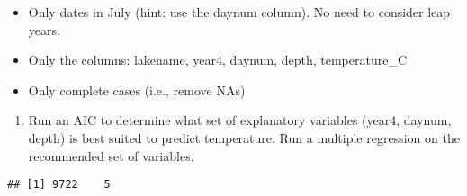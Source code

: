\documentclass[]{article}
\newenvironment{Shaded}{\begin{snugshade}}{\end{snugshade}}
\newcommand{\CommentTok}[1]{\textcolor[rgb]{0.56,0.35,0.01}{\textit{#1}}}
\newcommand{\DataTypeTok}[1]{\textcolor[rgb]{0.13,0.29,0.53}{#1}}
\newcommand{\DecValTok}[1]{\textcolor[rgb]{0.00,0.00,0.81}{#1}}
\newcommand{\KeywordTok}[1]{\textcolor[rgb]{0.13,0.29,0.53}{\textbf{#1}}}
\newcommand{\NormalTok}[1]{#1}
\newcommand{\OperatorTok}[1]{\textcolor[rgb]{0.81,0.36,0.00}{\textbf{#1}}}
\newcommand{\StringTok}[1]{\textcolor[rgb]{0.31,0.60,0.02}{#1}}
\providecommand{\tightlist}{%
  \setlength{\itemsep}{0pt}\setlength{\parskip}{0pt}}
\begin{document}
\begin{itemize}
\tightlist
\item
  Only dates in July (hint: use the daynum column). No need to consider
  leap years.
\item
  Only the columns: lakename, year4, daynum, depth, temperature\_C
\item
  Only complete cases (i.e., remove NAs)
\end{itemize}

\begin{enumerate}
\def\labelenumi{\arabic{enumi}.}
\setcounter{enumi}{3}
\tightlist
\item
  Run an AIC to determine what set of explanatory variables (year4,
  daynum, depth) is best suited to predict temperature. Run a multiple
  regression on the recommended set of variables.
\end{enumerate}

\begin{Shaded}
\end{Shaded}

\begin{verbatim}
## [1] 9722    5
\end{verbatim}

\begin{Shaded}
\end{Shaded}
\end{document}

